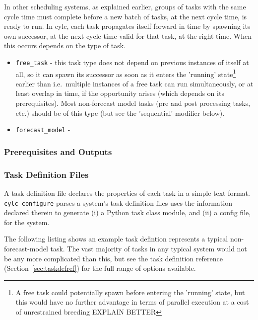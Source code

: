 \documentclass[11pt,a4paper]{article}
\begin{document}
In other scheduling systems, as explained earlier, groups of tasks with
the same cycle time must complete before a new batch of tasks, at the
next cycle time, is ready to run. In cylc, each task propagates itself
forward in time by spawning its own successor, at the next cycle time 
valid for that task, at the right time. When this occurs depends on the
type of task. 

\begin{itemize}
    \item \lstinline=free_task= - this task type does not depend on
        previous instances of itself at all, so it can spawn its
        successor as soon as it enters the 'running'
        state\footnote{A free task could potentially spawn before
        entering the 'running' state, but this would have no further
        advantage in terms of parallel execution at a cost of
        unrestrained breeding EXPLAIN BETTER} earlier than
        i.e.\ multiple instances of a free task can run simultaneously,
        or at least overlap in time, if the opportunity arises (which
        depends on its prerequisites). Most non-forecast model tasks
        (pre and post processing tasks, etc.) should be of this type
        (but see the 'sequential' modifier below).    

    \item \lstinline=forecast_model= - 
\end{itemize}


\label{sec:requisites}
\subsubsection{Prerequisites and Outputs}


\pagebreak
\label{sec:taskdef}
\subsubsection{Task Definition Files}

A task definition file declares the properties of each task in a simple
text format.  \lstinline=cylc configure= parses a system's task definition
files uses the information declared therein to generate (i) a Python
task class module, and (ii) a config file, for the system.

The following listing shows an example task defintion represents a
typical non-forecast-model task. The vast majority of tasks in any
typical system would not be any more complicated than this, but see the
task definition reference (Section~\ref{sec:taskdefref}) for the full
range of options available.
\end{document}
